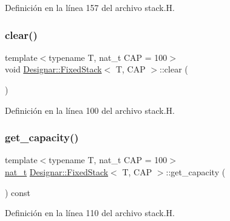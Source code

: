 Definición en la línea 157 del archivo stack.\+H.

\mbox{\label{class_designar_1_1_fixed_stack_a63b4e0110ee9590eba7b2e776159eb17}} 
\subsubsection{\texorpdfstring{clear()}{clear()}}
{\footnotesize\ttfamily template$<$typename T, nat\+\_\+t C\+AP = 100$>$ \\
void \hyperlink{class_designar_1_1_fixed_stack}{Designar\+::\+Fixed\+Stack}$<$ T, C\+AP $>$\+::clear (\begin{DoxyParamCaption}{ }\end{DoxyParamCaption})\hspace{0.3cm}{\ttfamily [inline]}}



Definición en la línea 100 del archivo stack.\+H.

\mbox{\label{class_designar_1_1_fixed_stack_a617775aac061d6a003c7e1638e3e82bb}} 
\subsubsection{\texorpdfstring{get\+\_\+capacity()}{get\_capacity()}}
{\footnotesize\ttfamily template$<$typename T, nat\+\_\+t C\+AP = 100$>$ \\
\hyperlink{namespace_designar_aa72662848b9f4815e7bf31a7cf3e33d1}{nat\+\_\+t} \hyperlink{class_designar_1_1_fixed_stack}{Designar\+::\+Fixed\+Stack}$<$ T, C\+AP $>$\+::get\+\_\+capacity (\begin{DoxyParamCaption}{ }\end{DoxyParamCaption}) const\hspace{0.3cm}{\ttfamily [inline]}}



Definición en la línea 110 del archivo stack.\+H.

\mbox{\label{class_designar_1_1_fixed_stack_a59e1c93e8653984ac828840111914982}} 
